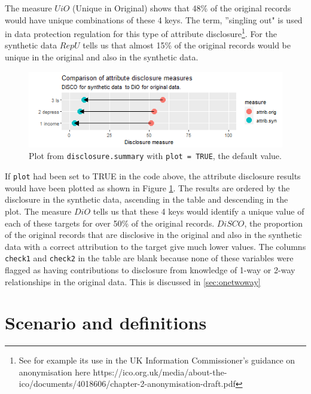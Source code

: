 \documentclass[12pt]{article}
\renewcommand{\baselinestretch}{1.5} %
\begin{document}
The measure $UiO$ (Unique in Original) shows that  48\% of the original records would have unique combinations of these 4 keys. The term, ''singling out" is used in data protection regulation for this type of attribute disclosure\footnote{See for example its use in the UK Information Commissioner's guidance on anonymisation here https://ico.org.uk/media/about-the-ico/documents/4018606/chapter-2-anonymisation-draft.pdf}. For the synthetic data $RepU$ tells us that almost 15\% of the original records would be unique in the original and also in the synthetic data. 
\begin{figure}[h]
    \centering
    \includegraphics[width=1\linewidth]{fig1dis.png}
    \caption{Plot from \texttt{disclosure.summary} with \texttt{plot = TRUE}, the default value.}
    \label{fig:f1}
\end{figure}
\renewcommand{\baselinestretch}{1.5} 
If \texttt{plot} had been set to TRUE in the code above, the attribute disclosure results would have been plotted as shown in Figure \ref{fig:f1}.
The results are ordered by the disclosure in the synthetic data, ascending in the table and descending
in the plot. The measure $DiO$  tells us that these 4 keys would identify a unique value of each of these targets for over 50\% of the original records.  $DiSCO$, the proportion of the original records that are disclosive in the original and also in the synthetic data with a correct attribution to the target give much lower values.  The columns \texttt{check1} and \texttt{check2} in the table are blank because none of these variables
were flagged as having contributions to disclosure from knowledge of 1-way or 2-way relationships in the original data.
This is discussed in \ref{sec:onetwoway}
\section{Scenario and definitions}\label{sec:sc_def_not}
\end{document}
